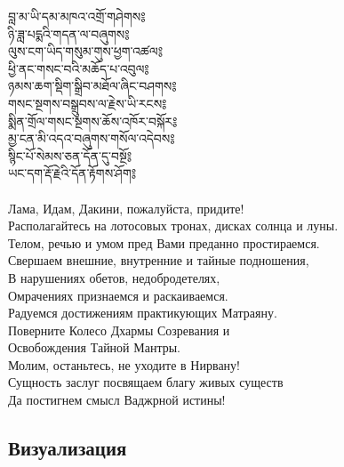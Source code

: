 \ti
བླ་མ་ཡི་དམ་མཁའ་འགྲོ་གཤེགས༔\\
ཉི་ཟླ་པདྨའི་གདན་ལ་བཞུགས༔\\
ལུས་ངག་ཡིད་གསུམ་གུས་ཕྱག་འཚལ༔\\
ཕྱི་ནང་གསང་བའི་མཆོད་པ་འབུལ༔\\
ཉམས་ཆག་སྡིག་སྒྲིབ་མཐོལ་ཞིང་བཤགས༔\\
གསང་སྔགས་བསྒྲུབས་ལ་རྗེས་ཡི་རངས༔\\
སྨིན་གྲོལ་གསང་སྔགས་ཆོས་འཁོར་བསྐོར༔\\
མྱ་ངན་མི་འདའ་བཞུགས་གསོལ་འདེབས༔\\
སྙིང་པོ་སེམས་ཅན་དོན་དུ་བསྔོ༔\\
ཡང་དག་རྡོ་རྗེའི་དོན་རྟོགས་ཤོག༔\\
\\
\ru
Лама, Идам, Дакини, пожалуйста, придите!\\
Располагайтесь на лотосовых тронах, дисках солнца и луны.\\
Телом, речью и умом пред Вами преданно простираемся.\\
Свершаем внешние, внутренние и тайные подношения,\\
В нарушениях обетов, недобродетелях,\\
Омрачениях признаемся и раскаиваемся.\\
Радуемся достижениям практикующих Матраяну.\\
Поверните Колесо Дхармы Созревания и\\
Освобождения Тайной Мантры.\\
Молим, останьтесь, не уходите в Нирвану!\\
Сущность заслуг посвящаем благу живых существ\\
Да постигнем смысл Ваджрной истины!\\

\newpage
\subsection{Визуализация}

